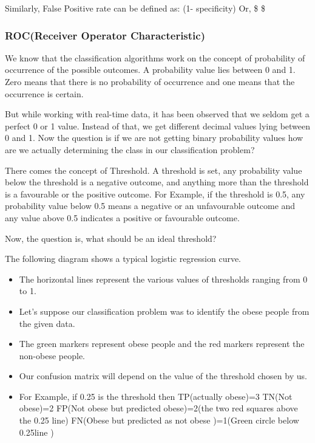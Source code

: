\documentclass[11pt]{article}
\providecommand{\tightlist}{%
      \setlength{\itemsep}{0pt}\setlength{\parskip}{0pt}}
\begin{document}
Similarly, False Positive rate can be defined as: (1- specificity) Or,
\$  \$

    \subsubsection{ROC(Receiver Operator
Characteristic)}\label{rocreceiver-operator-characteristic}

We know that the classification algorithms work on the concept of
probability of occurrence of the possible outcomes. A probability value
lies between 0 and 1. Zero means that there is no probability of
occurrence and one means that the occurrence is certain.

But while working with real-time data, it has been observed that we
seldom get a perfect 0 or 1 value. Instead of that, we get different
decimal values lying between 0 and 1. Now the question is if we are not
getting binary probability values how are we actually determining the
class in our classification problem?

There comes the concept of Threshold. A threshold is set, any
probability value below the threshold is a negative outcome, and
anything more than the threshold is a favourable or the positive
outcome. For Example, if the threshold is 0.5, any probability value
below 0.5 means a negative or an unfavourable outcome and any value
above 0.5 indicates a positive or favourable outcome.

Now, the question is, what should be an ideal threshold?

    The following diagram shows a typical logistic regression curve.

\begin{itemize}
\tightlist
\item
  The horizontal lines represent the various values of thresholds
  ranging from 0 to 1.
\item
  Let's suppose our classification problem was to identify the obese
  people from the given data.
\item
  The green markers represent obese people and the red markers represent
  the non-obese people.
\item
  Our confusion matrix will depend on the value of the threshold chosen
  by us.
\item
  For Example, if 0.25 is the threshold then TP(actually obese)=3 TN(Not
  obese)=2 FP(Not obese but predicted obese)=2(the two red squares above
  the 0.25 line) FN(Obese but predicted as not obese )=1(Green circle
  below 0.25line )
\end{itemize}
\end{document}
